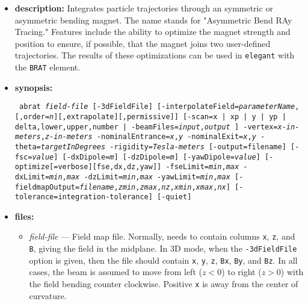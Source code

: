\documentclass[11pt]{article}
\begin{document}
\begin{itemize}
\item {\bf description:}  Integrates particle trajectories through an symmetric or asymmetric bending magnet.
The name stands for "Asymmetric Bend RAy Tracing."
Features include the ability to optimize the magnet strength and position to ensure, if possible, that the
magnet joins two user-defined trajectories.
The results of these optimizations can be used in {\tt elegant} with the \verb|BRAT| element.

\item {\bf synopsis:}
\begin{flushleft}{\tt
abrat {\em field-file} [-3dFieldFile] [-interpolateField={\em parameterName},[,order={\em n}][,extrapolate][,permissive]] 
 [{-scan={x | xp | y | yp | delta},lower,upper,number | -beamFiles={\em input},{\em output} }]
 -vertex={\em x-in-meters},{\em z-in-meters} -nominalEntrance={\em x},{\em y} -nominalExit={\em x},{\em y}
 -theta={\em targetInDegrees} -rigidity={\em Tesla-meters}
 [-output=filename] [-fsc={\em value}] [-dxDipole={\em m}] [-dzDipole={\em m}] [-yawDipole={\em value}]
 {[-optimize[=verbose][{fse,dx,dz,yaw}]]
  -fseLimit={\em min},{\em max} -dxLimit={\em min},{\em max} -dzLimit={\em min},{\em max} -yawLimit={\em min},{\em max}}
 [-fieldmapOutput={\em filename},{\em zmin},{\em zmax},{\em nz},{\em xmin},{\em xmax},{\em nx}]
 [-tolerance=integration-tolerance]
 [-quiet]
}\end{flushleft}

\item {\bf files:}
\begin{itemize}
\item {\em field-file} --- Field map file. Normally, needs to contain columns \verb|x|, \verb|z|, and \verb|B|, giving the 
field in the midplane. In 3D mode, when the \verb|-3dFieldFile| option is given, then the file should contain
\verb|x|, \verb|y|, \verb|z|, \verb|Bx|, \verb|By|, and \verb|Bz|. 
In all cases, the beam is assumed to move from left ($z<0$) to right ($z>0$) with the field bending counter clockwise.
Positive \verb|x| is away from the center of curvature.
\end{itemize}


\end{itemize}
\end{document}
